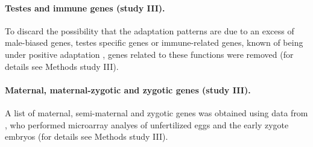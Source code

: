 \paragraph{Testes and immune genes (study III).}
To discard the possibility that the adaptation patterns are due to an excess of male-biased genes, testes specific genes or immune-related genes, known of being under positive adaptation \citep{Civetta1995,Swanson2001,Artieri2009,Obbard2009}, genes related to these functions were removed (for details see Methods study III).

\paragraph{Maternal, maternal-zygotic and zygotic genes (study III).}
A list of maternal, semi-maternal and zygotic genes was obtained using data from \citet{Thomsen2010}, who performed microarray analyes of unfertilized eggs and the early zygote embryos (for details see Methods study III).